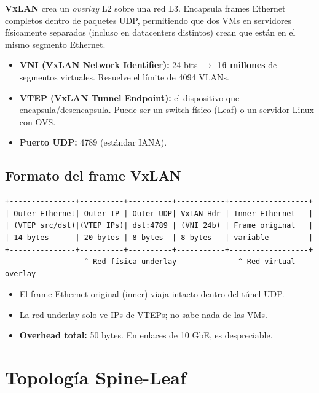 \begin{concepto}
\textbf{VxLAN} crea un \emph{overlay} L2 sobre una red L3. Encapsula frames Ethernet
completos dentro de paquetes UDP, permitiendo que dos VMs en servidores físicamente
separados (incluso en datacenters distintos) crean que están en el mismo segmento Ethernet.

\begin{itemize}
    \item \textbf{VNI (VxLAN Network Identifier):} 24 bits $\to$ \textbf{16 millones}
          de segmentos virtuales. Resuelve el límite de 4094 VLANs.
    \item \textbf{VTEP (VxLAN Tunnel Endpoint):} el dispositivo que encapsula/desencapsula.
          Puede ser un switch físico (Leaf) o un servidor Linux con OVS.
    \item \textbf{Puerto UDP:} 4789 (estándar IANA).
\end{itemize}
\end{concepto}

\subsection{Formato del frame VxLAN}

\begin{lstlisting}
+---------------+----------+----------+-----------+------------------+
| Outer Ethernet| Outer IP | Outer UDP| VxLAN Hdr | Inner Ethernet   |
| (VTEP src/dst)|(VTEP IPs)| dst:4789 | (VNI 24b) | Frame original   |
| 14 bytes      | 20 bytes | 8 bytes  | 8 bytes   | variable         |
+---------------+----------+----------+-----------+------------------+
                  ^ Red física underlay              ^ Red virtual overlay
\end{lstlisting}

\begin{itemize}
    \item El frame Ethernet original (inner) viaja intacto dentro del túnel UDP.
    \item La red underlay solo ve IPs de VTEPs; no sabe nada de las VMs.
    \item \textbf{Overhead total:} 50 bytes. En enlaces de 10 GbE, es despreciable.
\end{itemize}

\section{ Topología Spine-Leaf}

